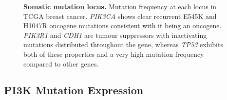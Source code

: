 \begin{figure}[!ht]
\begin{mdframed}
\begin{center}
{        }
    \end{center}
    \caption[Somatic mutation locus]{\small \textbf{Somatic mutation locus.} Mutation frequency at each locus in TCGA breast cancer. \textit{PIK3CA} shows clear recurrent E545K and H1047R oncogene mutations consistent with it being an oncogene. \textit{PIK3R1} and \textit{CDH1} are tumour suppressors with inactivating mutations distributed throughout the gene, whereas \textit{TP53} exhibits both of these properties and a very high mutation frequency compared to other genes.
}
\label{fig:mutation_locus}
\end{mdframed}
\end{figure}

\clearpage
\subsection{PI3K Mutation Expression}

